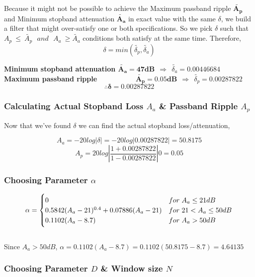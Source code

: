 \documentclass[11pt]{article}
\begin{document}
Because it might not be possible to achieve the {Maximum passband ripple $\mathbf{\tilde{A_p}}$} and {Minimum stopband attenuation $\mathbf{\tilde{A_a}}$} in exact value
with the same $\delta$, we build a filter that might over-satisfy one or both specifications. 
So we pick $\delta$ such that $A_{p} \ \leqslant \ \tilde{A_{p}} \ \ \ and\ \ \ A_{a} \ \geqslant \tilde{A_{a}}$ conditions both satisfy at the same time. Therefore,
$$\delta = min\left(\tilde{\delta_p},\tilde{\delta_a}\right)$$

{\color{ultramarine} \bf Minimum stopband attenuation $\mathbf{\tilde{A_a} = 47 dB} \ \ \Rightarrow \ \ \tilde{\delta _{a}}= 0.00446684 $}\\
{\color{ultramarine} \bf Maximum passband ripple \ \ \ \ \  \ \ \ \ $\mathbf{\tilde{A_p} = 0.05 dB} \ \ \Rightarrow \ \ \tilde{\delta _{p}}= 0.00287822$} 
{\color{ultramarine} $$\mathbf{\therefore \delta = 0.00287822}$$}

\subsubsection{Calculating Actual Stopband Loss $A_a$ \& Passband Ripple $A_p$}
Now that we've found $\delta$ we can find the actual stopband loss/attenuation,

{\color{ultramarine} $$A_{a} =-20log|\delta | = -20log|0.00287822| = 50.8175 $$}
{\color{ultramarine}$$A_{p} =20log|\frac{1+0.00287822 }{1-0.00287822 }|0  = 0.05 $$}
\subsubsection{Choosing Parameter $\alpha$}
\[
    \alpha = \begin{cases}
    0 & for \hspace*{3pt} A_a \leq 21 dB \\ 
    0.5842(A_a - 21)^{0.4} + 0.07886(A_a - 21) & for \hspace*{3pt} 21 < A_a \leq 50 dB \\
    0.1102(A_a - 8.7) & for \hspace*{3pt} A_a > 50 dB
   \end{cases}
   \]\\

   {\color{ultramarine} Since $A_a>50dB$, $\alpha = 0.1102(A_a - 8.7) = 0.1102(50.8175 - 8.7) = 4.64135$}
  

\subsubsection{Choosing Parameter $D$ \& Window size $N$}
\end{document}
